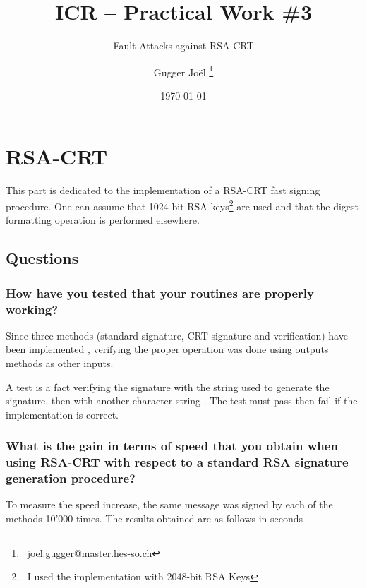 \documentclass[a4paper]{report}
\title{ICR -- Practical Work \#3}
\subtitle{Fault Attacks against RSA-CRT}
\author{Gugger Joël \thanks{\ \href{mailto:joel.gugger@master.hes-so.ch}{joel.gugger@master.hes-so.ch}}}
\date{\today}
\begin{document}
 
\maketitle


\tableofcontents

 
\chapter{RSA-CRT}
This part is dedicated to the implementation of a RSA-CRT fast signing procedure. One can assume that 1024-bit RSA keys\footnote{\ I used the implementation with 2048-bit RSA Keys} are used and that the digest formatting operation is performed elsewhere.

\section{Questions}
\subsection{How have you tested that your routines are properly working?}
Since three methods (standard signature, CRT signature and verification) have been implemented , verifying the proper operation was done using outputs methods as other inputs.

A test is a fact verifying the signature with the string used to generate the signature, then with another character string . The test must pass then fail if the implementation is correct.

\subsection{What is the gain in terms of speed that you obtain when using RSA-CRT with respect to a standard RSA signature generation procedure?}
To measure the speed increase, the same message was signed by each of the methods 10'000 times. The results obtained are as follows in seconds
\end{document}
